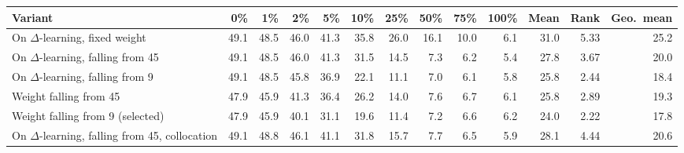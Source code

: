 \begin{tabular}{lrrrrrrrrrrrr}
\toprule
\textbf{Variant} & \textbf{0\%} & \textbf{1\%} & \textbf{2\%} & \textbf{5\%} & \textbf{10\%} & \textbf{25\%} & \textbf{50\%} & \textbf{75\%} & \textbf{100\%} & \textbf{Mean} & \textbf{Rank} & \textbf{Geo.\ mean} \\
\midrule
On $\Delta$-learning, fixed weight & 49.1 & 48.5 & 46.0 & 41.3 & 35.8 & 26.0 & 16.1 & 10.0 & 6.1 & 31.0 & 5.33 & 25.2 \\
On $\Delta$-learning, falling from 45 & 49.1 & 48.5 & 46.0 & 41.3 & 31.5 & 14.5 & 7.3 & 6.2 & 5.4 & 27.8 & 3.67 & 20.0 \\
On $\Delta$-learning, falling from 9 & 49.1 & 48.5 & 45.8 & 36.9 & 22.1 & 11.1 & 7.0 & 6.1 & 5.8 & 25.8 & 2.44 & 18.4 \\
Weight falling from 45 & 47.9 & 45.9 & 41.3 & 36.4 & 26.2 & 14.0 & 7.6 & 6.7 & 6.1 & 25.8 & 2.89 & 19.3 \\
Weight falling from 9 (selected) & 47.9 & 45.9 & 40.1 & 31.1 & 19.6 & 11.4 & 7.2 & 6.6 & 6.2 & 24.0 & 2.22 & 17.8 \\
On $\Delta$-learning, falling from 45, collocation & 49.1 & 48.8 & 46.1 & 41.1 & 31.8 & 15.7 & 7.7 & 6.5 & 5.9 & 28.1 & 4.44 & 20.6 \\
\bottomrule
\end{tabular}

